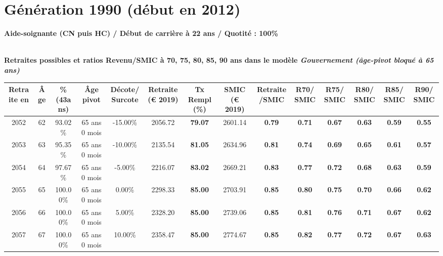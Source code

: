 \newpage 
 
\section{Génération 1990 (début en 2012)\label{AideSoignant_100_1990_22_0}} 
 
{\bf \noindent Aide-soignante (CN puis HC) / Début de carrière à 22 ans / Quotité : 100\%}  ~ 

 ~\\{\bf \noindent Retraites possibles et ratios Revenu/SMIC à 70, 75, 80, 85, 90 ans dans le modèle \emph{Gouvernement (âge-pivot bloqué à 65 ans)}}  
 
\begin{adjustbox}{max width=\textwidth} 
\begin{tabular}[htb]{|c|c||c|c|c||c|c||c|c||c|c|c|c|c|} 
\hline 
 Retraite en &  Âge &  \%(43ans) &  Âge pivot &  Décote/Surcote &  Retraite (\euro{} 2019) &  Tx Rempl(\%) &  SMIC (\euro{} 2019) &  Retraite/SMIC &  R70/SMIC &  R75/SMIC &  R80/SMIC &  R85/SMIC &  R90/SMIC \\ 
\hline \hline 
 2052 &  62 &  93.02\% &  65 ans 0 mois &  -15.00\% &  2056.72 &  {\bf 79.07} &  2601.14 &  {\bf {\color{red} 0.79}} &  {\bf {\color{red} 0.71}} &  {\bf {\color{red} 0.67}} &  {\bf {\color{red} 0.63}} &  {\bf {\color{red} 0.59}} &  {\bf {\color{red} 0.55}} \\ 
\hline 
 2053 &  63 &  95.35\% &  65 ans 0 mois &  -10.00\% &  2135.54 &  {\bf 81.05} &  2634.96 &  {\bf {\color{red} 0.81}} &  {\bf {\color{red} 0.74}} &  {\bf {\color{red} 0.69}} &  {\bf {\color{red} 0.65}} &  {\bf {\color{red} 0.61}} &  {\bf {\color{red} 0.57}} \\ 
\hline 
 2054 &  64 &  97.67\% &  65 ans 0 mois &  -5.00\% &  2216.07 &  {\bf 83.02} &  2669.21 &  {\bf {\color{red} 0.83}} &  {\bf {\color{red} 0.77}} &  {\bf {\color{red} 0.72}} &  {\bf {\color{red} 0.68}} &  {\bf {\color{red} 0.63}} &  {\bf {\color{red} 0.59}} \\ 
\hline 
 2055 &  65 &  100.00\% &  65 ans 0 mois &  0.00\% &  2298.33 &  {\bf 85.00} &  2703.91 &  {\bf {\color{red} 0.85}} &  {\bf {\color{red} 0.80}} &  {\bf {\color{red} 0.75}} &  {\bf {\color{red} 0.70}} &  {\bf {\color{red} 0.66}} &  {\bf {\color{red} 0.62}} \\ 
\hline 
 2056 &  66 &  100.00\% &  65 ans 0 mois &  5.00\% &  2328.20 &  {\bf 85.00} &  2739.06 &  {\bf {\color{red} 0.85}} &  {\bf {\color{red} 0.81}} &  {\bf {\color{red} 0.76}} &  {\bf {\color{red} 0.71}} &  {\bf {\color{red} 0.67}} &  {\bf {\color{red} 0.62}} \\ 
\hline 
 2057 &  67 &  100.00\% &  65 ans 0 mois &  10.00\% &  2358.47 &  {\bf 85.00} &  2774.67 &  {\bf {\color{red} 0.85}} &  {\bf {\color{red} 0.82}} &  {\bf {\color{red} 0.77}} &  {\bf {\color{red} 0.72}} &  {\bf {\color{red} 0.67}} &  {\bf {\color{red} 0.63}} \\ 
\hline 
\hline 
\end{tabular} 
\end{adjustbox} 
 
